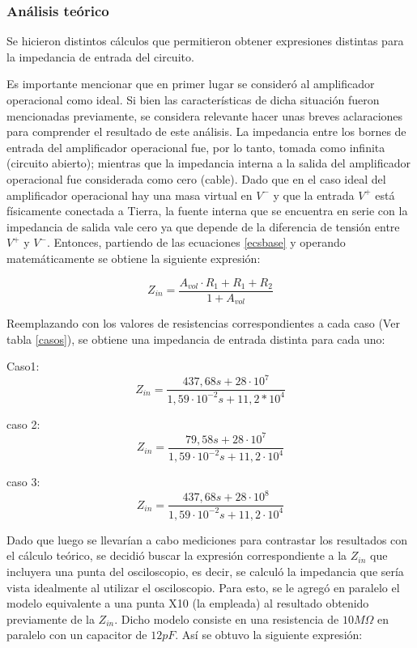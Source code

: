 \subsubsection*{An\'alisis te\'orico} %
Se hicieron distintos c\'alculos que permitieron obtener expresiones distintas para la impedancia de entrada del circuito.

Es importante mencionar que en primer lugar se consider\'o al amplificador operacional como ideal. Si bien las caracter\'isticas de dicha situaci\'on fueron mencionadas previamente, se considera relevante hacer unas breves aclaraciones para comprender el resultado de este an\'alisis. La impedancia entre los bornes de entrada del amplificador operacional fue, por lo tanto, tomada como infinita (circuito abierto); mientras que la impedancia interna a la salida del amplificador operacional fue considerada como cero (cable). Dado que en el caso ideal del amplificador operacional hay una masa virtual en $V^-$ y que la entrada $V^+$ est\'a f\'isicamente conectada a Tierra, la fuente interna que se encuentra en serie con la impedancia de salida vale cero ya que depende de la diferencia de tensi\'on entre $V^+$ y $V^-$. Entonces, partiendo de las ecuaciones \ref{ecsbase} y operando matem\'aticamente se obtiene la siguiente expresi\'on:

\begin{equation}
	Z_{in} =  \frac{A_{vol} \cdot R_1 + R_1 + R_2}{1 + A_{vol}}
	\label{zint}
\end{equation}

Reemplazando con los valores de resistencias correspondientes a cada caso (Ver tabla \ref{casos}), se obtiene una impedancia de entrada distinta para cada uno:

Caso1:
\begin{equation}
	Z_{in} =  \frac{437,68 s + 28 \cdot 10^7}{1,59 \cdot 10^{-2} s + 11,2 * 10^4}
	\label{c1c1zint}
\end{equation}

caso 2:
\begin{equation}
	Z_{in} =  \frac{79,58 s + 28 \cdot 10^7}{1,59 \cdot 10^{-2} s + 11,2 \cdot 10^4}
	\label{c1c2zint}
\end{equation}

caso 3:
\begin{equation}
	Z_{in} =  \frac{437,68 s + 28 \cdot 10^8}{1,59 \cdot 10^{-2} s + 11,2 \cdot 10^4}
	\label{c1c3zint}
\end{equation}


Dado que luego se llevar\'ian a cabo mediciones para contrastar los resultados con el c\'alculo te\'orico, se decidi\'o buscar la expresi\'on correspondiente a la $Z_{in}$ que incluyera una punta del osciloscopio, es decir, se calcul\'o la impedancia que ser\'ia vista idealmente al utilizar el osciloscopio. Para esto, se le agreg\'o en paralelo el modelo equivalente a una punta X10 (la empleada) al resultado obtenido previamente de la $Z_{in}$. Dicho modelo consiste en una resistencia de $10M\Omega$ en paralelo con un capacitor de $12pF$. As\'i se obtuvo la siguiente expresi\'on:

